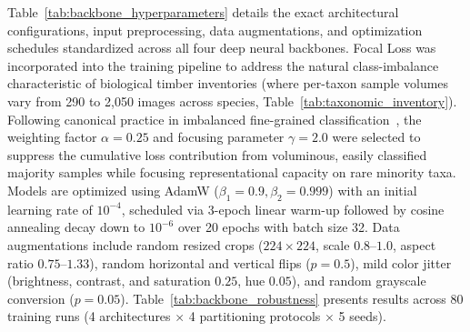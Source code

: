\documentclass[a4paper,fleqn]{cas-sc}
\begin{document}
Table~\ref{tab:backbone_hyperparameters} details the exact architectural configurations, input preprocessing, data augmentations, and optimization schedules standardized across all four deep neural backbones. Focal Loss was incorporated into the training pipeline to address the natural class-imbalance characteristic of biological timber inventories (where per-taxon sample volumes vary from 290 to 2,050 images across species, Table~\ref{tab:taxonomic_inventory}). Following canonical practice in imbalanced fine-grained classification~\cite{focal}, the weighting factor $\alpha=0.25$ and focusing parameter $\gamma=2.0$ were selected to suppress the cumulative loss contribution from voluminous, easily classified majority samples while focusing representational capacity on rare minority taxa. Models are optimized using AdamW ($\beta_1=0.9, \beta_2=0.999$) with an initial learning rate of $10^{-4}$, scheduled via 3-epoch linear warm-up followed by cosine annealing decay down to $10^{-6}$ over 20 epochs with batch size 32. Data augmentations include random resized crops ($224 \times 224$, scale $0.8$--$1.0$, aspect ratio $0.75$--$1.33$), random horizontal and vertical flips ($p=0.5$), mild color jitter (brightness, contrast, and saturation $0.25$, hue $0.05$), and random grayscale conversion ($p=0.05$). Table~\ref{tab:backbone_robustness} presents results across 80 training runs (4 architectures $\times$ 4 partitioning protocols $\times$ 5 seeds).
\end{document}
